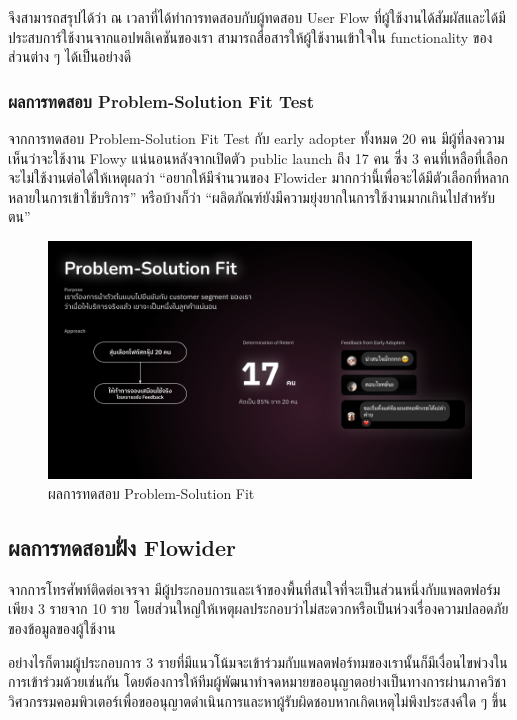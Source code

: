 จึงสามารถสรุปได้ว่า ณ เวลาที่ได้ทำการทดสอบกับผู้ทดสอบ  User Flow ที่ผู้ใช้งานได้สัมผัสและได้มีประสบการ์ใช้งานจากแอปพลิเคชันของเรา สามารถสื่อสารให้ผู้ใช้งานเข้าใจใน functionality ของส่วนต่าง ๆ ได้เป็นอย่างดี

\subsubsection{ผลการทดสอบ Problem-Solution Fit Test}
จากการทดสอบ Problem-Solution Fit Test กับ early adopter ทั้งหมด 20 คน มีผู้ที่ลงความเห็นว่าจะใช้งาน Flowy แน่นอนหลังจากเปิดตัว public launch ถึง 17 คน ซึ่ง 3 คนที่เหลือที่เลือกจะไม่ใช้งานต่อได้ให้เหตุผลว่า ``อยากให้มีจำนวนของ Flowider มากกว่านี้เพื่อจะได้มีตัวเลือกที่หลากหลายในการเข้าใช้บริการ'' หรือบ้างก็ว่า ``ผลิตภัณฑ์ยังมีความยุ่งยากในการใช้งานมากเกินไปสำหรับตน''
\begin{figure}[h]
    \begin{center}
    \includegraphics[width=\linewidth]{./image/Problem-Solution_Fit.png}
    \end{center}
    \caption[Problem-Solution Fit]{ผลการทดสอบ Problem-Solution Fit}
    \label{fig:Problem-Solution_Fit}
\end{figure}

\subsection{ผลการทดสอบฝั่ง Flowider}
จากการโทรศัพท์ติดต่อเจรจา มีผู้ประกอบการและเจ้าของพื้นที่สนใจที่จะเป็นส่วนหนึ่งกับแพลตฟอร์มเพียง 3 รายจาก 10 ราย โดยส่วนใหญ่ให้เหตุผลประกอบว่าไม่สะดวกหรือเป็นห่วงเรื่องความปลอดภัยของข้อมูลของผู้ใช้งาน

อย่างไรก็ตามผู้ประกอบการ 3 รายที่มีแนวโน้มจะเข้าร่วมกับแพลตฟอร์ทมของเรานั้นก็มีเงื่อนไขพ่วงในการเข้าร่วมด้วยเช่นกัน โดยต้องการให้ทีมผู้พัฒนาทำจดหมายขออนุญาตอย่างเป็นทางการผ่านภาควิชาวิศวกรรมคอมพิวเตอร์เพื่อขออนุญาตดำเนินการและหาผู้รับผิดชอบหากเกิดเหตุไม่พึงประสงค์ใด ๆ ขึ้น

